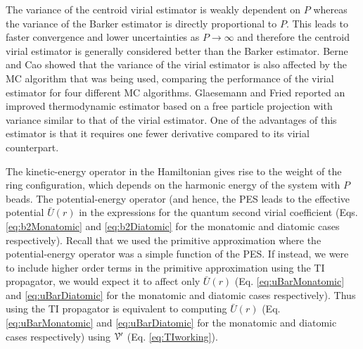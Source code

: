         The variance of the centroid virial estimator is weakly dependent on $P$ whereas the variance of the Barker estimator is directly proportional to $P$\cite{Cao1989}. This leads to faster convergence and lower uncertainties as $P \to \infty$ and therefore the centroid virial estimator is generally considered better than the Barker estimator. Berne and Cao\cite{Cao1989} showed that the variance of the virial estimator is also affected by the MC algorithm that was being used, comparing the performance of the virial estimator for four different MC algorithms. Glaesemann and Fried\cite{Glaesemann2002} reported an improved thermodynamic estimator based on a free particle projection with variance similar to that of the virial estimator. One of the advantages of this estimator is that it requires one fewer derivative compared to its virial counterpart.

        The kinetic-energy operator in the Hamiltonian gives rise to the weight of the ring configuration, which depends on the harmonic energy of the system with $P$ beads. The potential-energy operator (and hence, the \abinitio{} PES leads to the effective potential $\bar{U} (r)$ in the expressions for the quantum second virial coefficient (Eqs. \eqref{eq:b2Monatomic} and \eqref{eq:b2Diatomic} for the monatomic and diatomic cases respectively). Recall that we used the primitive approximation where the potential-energy operator was a simple function of the PES. If instead, we were to include higher order terms in the primitive approximation using the TI propagator, we would expect it to affect only $\bar{U} (r)$ (Eq. \eqref{eq:uBarMonatomic} and \eqref{eq:uBarDiatomic} for the monatomic and diatomic cases respectively). Thus using the TI propagator is equivalent to computing $\bar{U} (r)$ (Eq. \eqref{eq:uBarMonatomic} and \eqref{eq:uBarDiatomic} for the monatomic and diatomic cases respectively) using $\mathcal{V'}$ (Eq. \eqref{eq:TIworking}).


